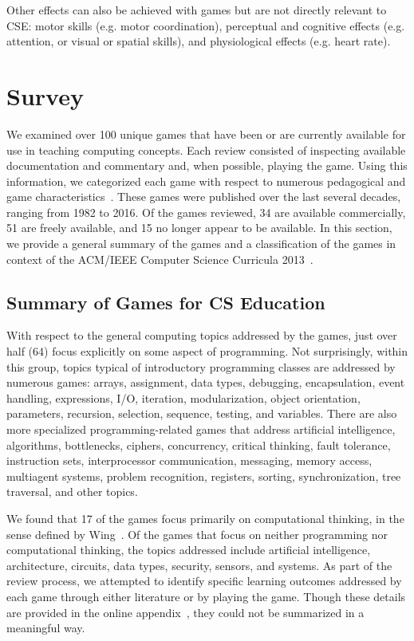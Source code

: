 \documentclass{sig-alternate-05-2015}
\begin{document}
Other effects can also be achieved with games but are not directly relevant to CSE: motor skills (e.g. motor coordination), perceptual and cognitive effects (e.g. attention, or visual or spatial skills), and physiological effects (e.g. heart rate).\section{Survey}


We examined over 100 unique games that have been or are currently available for use in teaching computing concepts. Each review consisted of inspecting available documentation and commentary and, when possible, playing the game. Using this information, we categorized each game with respect to numerous pedagogical and game characteristics~\cite{appendix}. These games were published over the last several decades, ranging from 1982 to 2016. Of the games reviewed, 34 are available commercially, 51 are freely available, and 15 no longer appear to be available. In this section, we provide a general summary of the games and a classification of the games in context of the ACM/IEEE Computer Science Curricula 2013~\cite{acm13computing}.\subsection{Summary of Games for CS Education}


With respect to the general computing topics addressed by the games, just over half (64) focus explicitly on some aspect of programming. Not surprisingly, within this group, topics typical of introductory programming classes are addressed by numerous games: arrays, assignment, data types, debugging, encapsulation, event handling, expressions, I/O, iteration, modularization, object orientation, parameters, recursion, selection, sequence, testing, and variables. There are also more specialized programming-related games that address artificial intelligence, algorithms, bottlenecks, ciphers, concurrency, critical thinking, fault tolerance, instruction sets, interprocessor communication, messaging, memory access, multiagent systems, problem recognition, registers, sorting, synchronization, tree traversal, and other topics. 



We found that 17 of the games focus primarily on computational thinking, in the sense defined by Wing~\cite{wing06computational}. Of the games that focus on neither programming nor computational thinking, the topics addressed include artificial intelligence, architecture, circuits, data types, security, sensors, and systems. As part of the review process, we attempted to identify specific learning outcomes addressed by each game through either literature or by playing the game. Though these details are provided in the online appendix~\cite{appendix}, they could not be summarized in a meaningful way.
\end{document}
